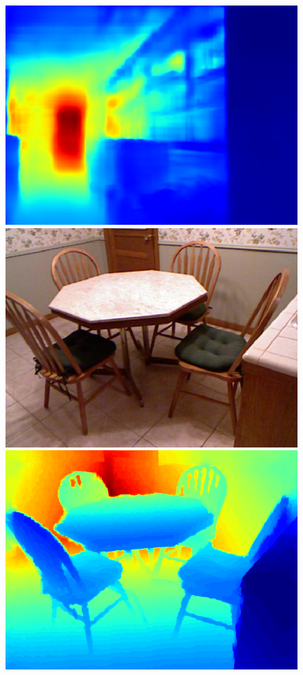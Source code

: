 \documentclass{svjour3}                     %
\begin{document}
\begin{figure}[t]
{\begin{minipage}[t]{0.15\linewidth}
  \includegraphics[width=1\linewidth]{images/nyu_without/office_rgb_00015.png}
  \includegraphics[width=1\linewidth]{images/nyu_rgb/760.png}
  \includegraphics[width=1\linewidth]{images/nyu_gt/760.png}

\end{minipage}}
\end{figure}
\end{document}

